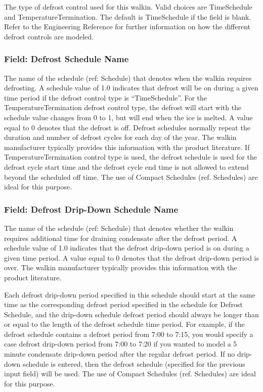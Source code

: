 The type of defrost control used for this walkin. Valid choices are TimeSchedule and TemperatureTermination. The default is TimeSchedule if the field is blank. Refer to the Engineering Reference for further information on how the different defrost controls are modeled.

\subsubsection{Field: Defrost Schedule Name}\label{field-defrost-schedule-name}

The name of the schedule (ref: Schedule) that denotes when the walkin requires defrosting. A schedule value of 1.0 indicates that defrost will be on during a given time period if the defrost control type is ``TimeSchedule''. For the TemperatureTermination defrost control type, the defrost will start with the schedule value changes from 0 to 1, but will end when the ice is melted. A value equal to 0 denotes that the defrost is off. Defrost schedules normally repeat the duration and number of defrost cycles for each day of the year. The walkin manufacturer typically provides this information with the product literature. If TemperatureTermination control type is used, the defrost schedule is used for the defrost cycle start time and the defrost cycle end time is not allowed to extend beyond the scheduled off time. The use of Compact Schedules (ref. Schedules) are ideal for this purpose.

\subsubsection{Field: Defrost Drip-Down Schedule Name}\label{field-defrost-drip-down-schedule-name}

The name of the schedule (ref: Schedule) that denotes whether the walkin requires additional time for draining condensate after the defrost period. A schedule value of 1.0 indicates that the defrost drip-down period is on during a given time period. A value equal to 0 denotes that the defrost drip-down period is over. The walkin manufacturer typically provides this information with the product literature.

Each defrost drip-down period specified in this schedule should start at the same time as the corresponding defrost period specified in the schedule for Defrost Schedule, and the drip-down schedule defrost period should always be longer than or equal to the length of the defrost schedule time period. For example, if the defrost schedule contains a defrost period from 7:00 to 7:15, you would specify a case defrost drip-down period from 7:00 to 7:20 if you wanted to model a 5 minute condensate drip-down period after the regular defrost period. If no drip-down schedule is entered, then the defrost schedule (specified for the previous input field) will be used. The use of Compact Schedules (ref. Schedules) are ideal for this purpose.

